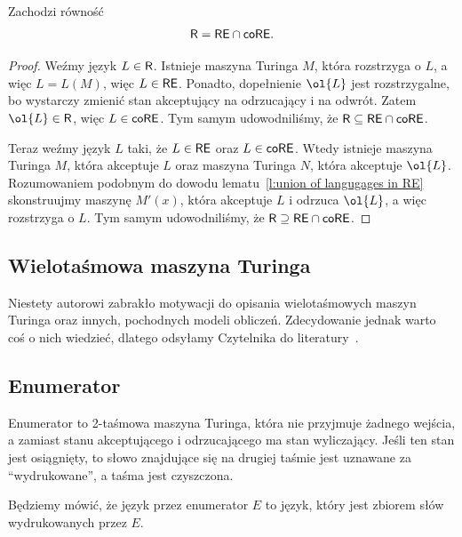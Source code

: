 \begin{theorem}
    Zachodzi równość
    \[ \textsf{R} = \textsf{RE} \cap \textsf{coRE}. \]
\end{theorem}
\begin{proof}
    Weźmy język $L \in \textsf{R}$. Istnieje maszyna Turinga $M$, która rozstrzyga o $L$, a więc $L = L(M)$, więc $L \in \textsf{RE}$. Ponadto, dopełnienie $\ol{L}$ jest rozstrzygalne, bo wystarczy zmienić stan akceptujący na odrzucający i na odwrót. Zatem $\ol{L} \in \Rclass$, więc $L \in \textsf{coRE}$. Tym samym udowodniliśmy, że $\textsf{R} \subseteq \textsf{RE} \cap \textsf{coRE}$.

    Teraz weźmy język $L$ taki, że $L \in \textsf{RE}$ oraz $L \in \textsf{coRE}$. Wtedy istnieje maszyna Turinga $M$, która akceptuje $L$ oraz maszyna Turinga $N$, która akceptuje $\ol{L}$. Rozumowaniem podobnym do dowodu lematu~\ref{l:union of langugages in RE} skonstruujmy maszynę $M'(x)$, która akceptuje $L$ i odrzuca $\ol{L}$, a więc rozstrzyga o $L$. Tym samym udowodniliśmy, że $\textsf{R} \supseteq \textsf{RE} \cap \textsf{coRE}$.
\end{proof}

\subsection{Wielotaśmowa maszyna Turinga}

Niestety autorowi zabrakło motywacji do opisania wielotaśmowych maszyn Turinga oraz innych, pochodnych modeli obliczeń. Zdecydowanie jednak warto coś o nich wiedzieć, dlatego odsyłamy Czytelnika do literatury~\cite{Adleman, AroraBarak, Faliszewski, Sipser}.

\subsection{Enumerator}
\begin{definition}
    Enumerator to 2-taśmowa maszyna Turinga, która nie przyjmuje żadnego wejścia, a zamiast stanu akceptującego i odrzucającego ma stan wyliczający. Jeśli ten stan jest osiągnięty, to słowo znajdujące się na drugiej taśmie jest uznawane za \enquote{wydrukowane}, a taśma jest czyszczona.
\end{definition}

Będziemy mówić, że język  przez enumerator $E$ to język, który jest zbiorem słów wydrukowanych przez $E$.

